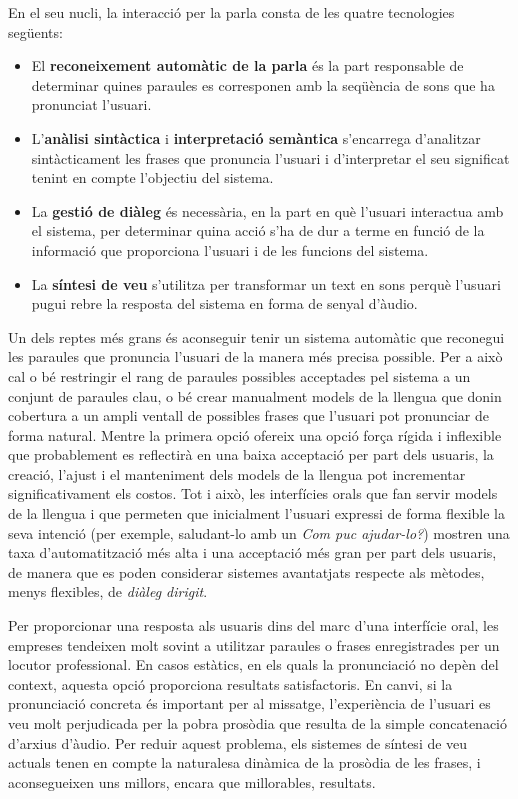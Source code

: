\begin{multicols}{2}
En el seu nucli, la interacció per la parla consta de les quatre tecnologies següents:
\begin{itemize}
\item El \textbf{reconeixement automàtic de la parla} és la part responsable de determinar quines paraules es corresponen amb la seqüència de sons que ha pronunciat l’usuari.
\item L’\textbf{anàlisi sintàctica} i \textbf{interpretació semàntica} s’encarrega d’analitzar sintàcticament les frases que pronuncia l’usuari i d’interpretar el seu significat tenint en compte l’objectiu del sistema.
\item La \textbf{gestió de diàleg} és necessària, en la part en què l’usuari interactua amb el sistema, per determinar quina acció s’ha de dur a terme en funció de la informació que proporciona l’usuari i de les funcions del sistema.
\item La \textbf{síntesi de veu} s’utilitza per transformar un text en sons perquè l’usuari pugui rebre la resposta del sistema en forma de senyal d’àudio. 
\end{itemize}

Un dels reptes més grans és aconseguir tenir un sistema automàtic que reconegui les paraules que pronuncia l’usuari de la manera més precisa possible. Per a això cal o bé restringir el rang de paraules possibles acceptades pel sistema a un conjunt de paraules clau, o bé crear manualment models de la llengua que donin cobertura a un ampli ventall de possibles frases que l’usuari pot pronunciar de forma natural. Mentre la primera opció ofereix una opció força rígida i inflexible que probablement es reflectirà en una baixa acceptació per part dels usuaris, la creació, l’ajust i el manteniment dels models de la llengua pot incrementar significativament els costos. Tot i això, les interfícies orals que fan servir models de la llengua i que permeten que inicialment l’usuari expressi de forma flexible la seva intenció (per exemple, saludant-lo amb un \textit{Com puc ajudar-lo?}) mostren una taxa d’automatització més alta i una acceptació més gran per part dels usuaris, de manera que es poden considerar sistemes avantatjats respecte als mètodes, menys flexibles, de \textit{diàleg dirigit}.

Per proporcionar una resposta als usuaris dins del marc d’una interfície oral, les empreses tendeixen molt sovint a utilitzar paraules o frases enregistrades per un locutor professional. En casos estàtics, en els quals la pronunciació no depèn del context, aquesta opció proporciona resultats satisfactoris. En canvi, si la pronunciació concreta és important per al missatge, l’experiència de l’usuari es veu molt perjudicada per la pobra prosòdia que resulta de la simple concatenació d’arxius d’àudio. Per reduir aquest problema, els sistemes de síntesi de veu actuals tenen en compte la naturalesa dinàmica de la prosòdia de les frases, i aconsegueixen uns millors, encara que millorables, resultats. 


\end{multicols}
